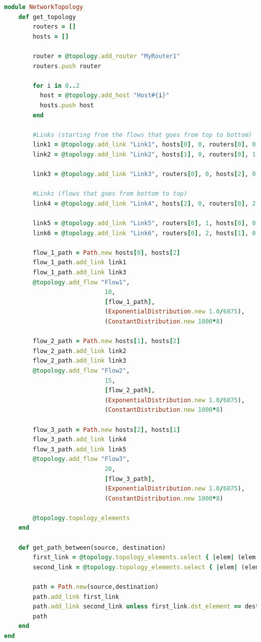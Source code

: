 \begin{lstlisting}[language=Ruby,breaklines=true]
module NetworkTopology
	def get_topology
		routers = []
        hosts = []

        router = @topology.add_router "MyRouter1"
        routers.push router

        for i in 0..2  
          host = @topology.add_host "Host#{i}"
          hosts.push host     
        end
        
        #Links (starting from the flows that goes from top to bottom)    
        link1 = @topology.add_link "Link1", hosts[0], 0, routers[0], 0
        link2 = @topology.add_link "Link2", hosts[1], 0, routers[0], 1

        link3 = @topology.add_link "Link3", routers[0], 0, hosts[2], 0

        #Links (flows that goes from bottom to top)    
        link4 = @topology.add_link "Link4", hosts[2], 0, routers[0], 2

        link5 = @topology.add_link "Link5", routers[0], 1, hosts[0], 0
        link6 = @topology.add_link "Link6", routers[0], 2, hosts[1], 0
        
		flow_1_path = Path.new hosts[0], hosts[2]
        flow_1_path.add_link link1
        flow_1_path.add_link link3
        @topology.add_flow "Flow1", 
                            10, 
                            [flow_1_path], 
                            (ExponentialDistribution.new 1.0/6875), 
                            (ConstantDistribution.new 1000*8)

        flow_2_path = Path.new hosts[1], hosts[2]
        flow_2_path.add_link link2
        flow_2_path.add_link link3
        @topology.add_flow "Flow2", 
                            15, 
                            [flow_2_path], 
                            (ExponentialDistribution.new 1.0/6875), 
                            (ConstantDistribution.new 1000*8)

        flow_3_path = Path.new hosts[2], hosts[1]
        flow_3_path.add_link link4
        flow_3_path.add_link link5
        @topology.add_flow "Flow3", 
                            20, 
                            [flow_3_path], 
                            (ExponentialDistribution.new 1.0/6875), 
                            (ConstantDistribution.new 1000*8)         
        
        @topology.topology_elements
	end
    
    def get_path_between(source, destination)
    	first_link = @topology.topology_elements.select { |elem| (elem.is_a? Link) && (elem.src_element == source) }.first
        second_link = @topology.topology_elements.select { |elem| (elem.is_a? Link) && (elem.dst_element == destination) }.first

        path = Path.new(source,destination)        
        path.add_link first_link
        path.add_link second_link unless first_link.dst_element == destination
        path
    end
end
\end{lstlisting}

